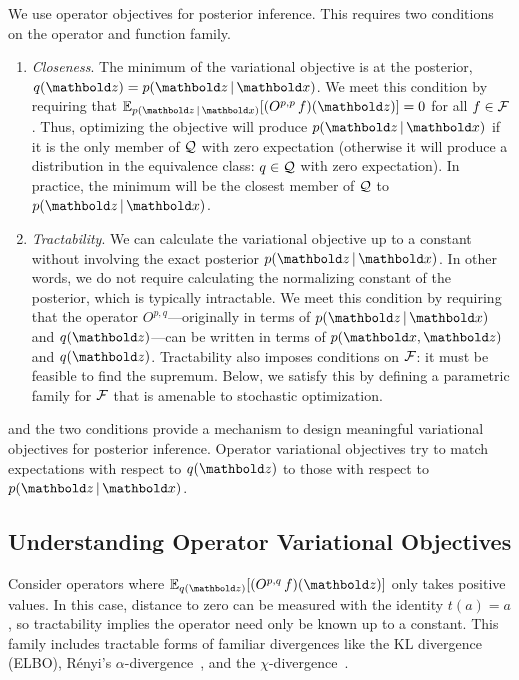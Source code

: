 We use operator objectives for posterior inference.  This
requires two conditions on the operator and function family.
\begin{enumerate}[leftmargin=*]
\item \emph{Closeness}.  The minimum of the variational objective is
  at the posterior, $q(\mbz)=p(\mbz\g \mbx)$.  We meet this condition by
  requiring that $\E_{p(\mbz\g \mbx)}[(O^{p,p} \, f)(\mbz)]=0$ for all $f \in \mathcal{F}$.
  Thus, optimizing the objective will produce $p(\mbz\g \mbx)$ if it is the
  only member of $\mathcal{Q}$ with zero expectation (otherwise it will
  produce a distribution in the equivalence class: $q \in \mathcal{Q}$ with
  zero expectation).  In practice, the minimum will be the closest
  member of $\mathcal{Q}$ to $p(\mbz \g \mbx)$.

\item \emph{Tractability}.  We can calculate the variational objective
  up to a constant without involving the exact posterior
  $p(\mbz\g \mbx)$.  In other words, we do not require calculating the
  normalizing constant of the posterior, which is typically
  intractable. We meet this condition by requiring that the operator
  $O^{p,q}$---originally in terms of $p(\mbz\g \mbx)$ and
  $q(\mbz)$---can be written in terms of $p(\mbx, \mbz)$ and
  $q(\mbz)$.  Tractability also imposes conditions on $\mathcal{F}$: it must
  be feasible to find the supremum.  Below, we satisfy this by
  defining a parametric family for $\mathcal{F}$ that is amenable to
  stochastic optimization.


\end{enumerate}
 and the two conditions provide a mechanism to
design meaningful variational objectives for posterior inference.
Operator variational objectives try to match expectations with respect
to $q(\mbz)$ to those with respect to $p(\mbz\g \mbx)$.


\subsection{Understanding Operator Variational Objectives}

Consider operators where $\E_{q(\mbz)}[(O^{p,q} \, f)(\mbz)]$ only
takes positive values. In this case, distance to zero can be measured
with the identity $t(a)=a$, so tractability implies the operator need
only be known up to a constant.  This family includes tractable forms
of familiar divergences like the \gls{KL} divergence (\gls{ELBO}), R\'enyi's
$\alpha$-divergence~\citep{li2016r}, and the
$\chi$-divergence~\citep{nielsen2013chi}.

